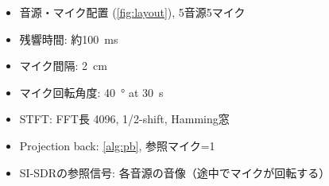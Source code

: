 \documentclass[sip,biber]{now-journal}
\begin{document}
\begin{itemize}
  \item 音源・マイク配置 (\cref{fig:layout}), 5音源5マイク
  \item 残響時間: 約\SI{100}{\milli\second}
  \item マイク間隔: \SI{2}{\centi\metre}
  \item マイク回転角度: \SI{40}{\degree} at \SI{30}{\second}
  \item STFT: FFT長 4096, 1/2-shift, Hamming窓
  \item Projection back: \cref{alg:pb}, 参照マイク=1
  \item SI-SDRの参照信号: 各音源の音像（途中でマイクが回転する）
\end{itemize}
\end{document}
